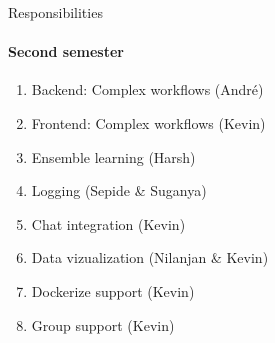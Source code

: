 \begin{frame}{Responsibilities}
\framesubtitle{Second semester}
	\begin{enumerate}
		\item Backend: Complex workflows (André)
		\item Frontend: Complex workflows (Kevin)
		\item Ensemble learning  (Harsh)
		\item Logging (Sepide \& Suganya)
		\item Chat integration (Kevin)
		\item Data vizualization (Nilanjan \& Kevin)
		\item Dockerize support (Kevin)
		\item Group support (Kevin)
	\end{enumerate}
\end{frame}